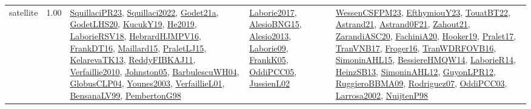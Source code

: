 {\begin{longtable}{p{3cm}r>{\raggedright\arraybackslash}p{6cm}>{\raggedright\arraybackslash}p{6cm}>{\raggedright\arraybackslash}p{8cm}}
\index{satellite}\index{ApplicationAreas!satellite}satellite &  1.00 & \hyperref[detail:SquillaciPR23]{SquillaciPR23}, \hyperref[detail:Squillaci2022]{Squillaci2022}, \hyperref[detail:Godet21a]{Godet21a}, \hyperref[detail:GodetLHS20]{GodetLHS20}, \hyperref[detail:KucukY19]{KucukY19}, \hyperref[detail:He2019]{He2019}, \hyperref[detail:LaborieRSV18]{LaborieRSV18}, \hyperref[detail:HebrardHJMPV16]{HebrardHJMPV16}, \hyperref[detail:FrankDT16]{FrankDT16}, \hyperref[detail:Maillard15]{Maillard15}, \hyperref[detail:PraletLJ15]{PraletLJ15}, \hyperref[detail:KelarevaTK13]{KelarevaTK13}, \hyperref[detail:ReddyFIBKAJ11]{ReddyFIBKAJ11}, \hyperref[detail:Verfaillie2010]{Verfaillie2010}, \hyperref[detail:Johnston05]{Johnston05}, \hyperref[detail:BarbulescuWH04]{BarbulescuWH04}, \hyperref[detail:GlobusCLP04]{GlobusCLP04}, \hyperref[detail:Younes2003]{Younes2003}, \hyperref[detail:VerfaillieL01]{VerfaillieL01}, \hyperref[detail:BensanaLV99]{BensanaLV99}, \hyperref[detail:PembertonG98]{PembertonG98} & \hyperref[detail:Laborie2017]{Laborie2017}, \hyperref[detail:AlesioBNG15]{AlesioBNG15}, \hyperref[detail:Alesio2013]{Alesio2013}, \hyperref[detail:Laborie09]{Laborie09}, \hyperref[detail:FrankK05]{FrankK05}, \hyperref[detail:OddiPCC05]{OddiPCC05}, \hyperref[detail:JussienL02]{JussienL02} & \hyperref[detail:WessenCSFPM23]{WessenCSFPM23}, \hyperref[detail:EfthymiouY23]{EfthymiouY23}, \hyperref[detail:TouatBT22]{TouatBT22}, \hyperref[detail:Astrand21]{Astrand21}, \hyperref[detail:Astrand0F21]{Astrand0F21}, \hyperref[detail:Zahout21]{Zahout21}, \hyperref[detail:ZarandiASC20]{ZarandiASC20}, \hyperref[detail:FachiniA20]{FachiniA20}, \hyperref[detail:Hooker19]{Hooker19}, \hyperref[detail:Pralet17]{Pralet17}, \hyperref[detail:TranVNB17]{TranVNB17}, \hyperref[detail:Froger16]{Froger16}, \hyperref[detail:TranWDRFOVB16]{TranWDRFOVB16}, \hyperref[detail:SimoninAHL15]{SimoninAHL15}, \hyperref[detail:BessiereHMQW14]{BessiereHMQW14}, \hyperref[detail:LaborieR14]{LaborieR14}, \hyperref[detail:HeinzSB13]{HeinzSB13}, \hyperref[detail:SimoninAHL12]{SimoninAHL12}, \hyperref[detail:GuyonLPR12]{GuyonLPR12}, \hyperref[detail:RuggieroBBMA09]{RuggieroBBMA09}, \hyperref[detail:Rodriguez07]{Rodriguez07}, \hyperref[detail:OddiPCC03]{OddiPCC03}, \hyperref[detail:Larrosa2002]{Larrosa2002}, \hyperref[detail:NuijtenP98]{NuijtenP98}\\

\end{longtable}}
